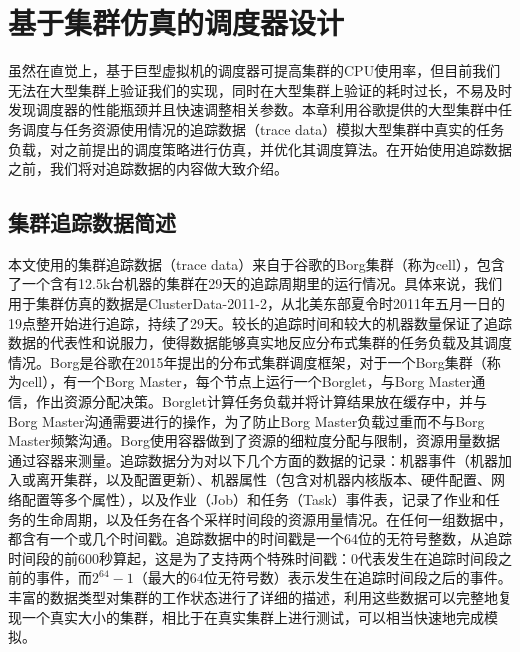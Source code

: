 
\chapter{基于集群仿真的调度器设计}
虽然在直觉上，基于巨型虚拟机的调度器可提高集群的CPU使用率，但目前我们无法在大型集群上验证我们的实现，同时在大型集群上验证的耗时过长，不易及时发现调度器的性能瓶颈并且快速调整相关参数。本章利用谷歌提供的大型集群中任务调度与任务资源使用情况的追踪数据（trace data）模拟大型集群中真实的任务负载，对之前提出的调度策略进行仿真，并优化其调度算法。在开始使用追踪数据之前，我们将对追踪数据的内容做大致介绍。

\section{集群追踪数据简述}
本文使用的集群追踪数据（trace data）来自于谷歌的Borg集群（称为cell），包含了一个含有12.5k台机器的集群在29天的追踪周期里的运行情况。具体来说，我们用于集群仿真的数据是ClusterData-2011-2，从北美东部夏令时2011年五月一日的19点整开始进行追踪，持续了29天。较长的追踪时间和较大的机器数量保证了追踪数据的代表性和说服力，使得数据能够真实地反应分布式集群的任务负载及其调度情况。Borg\cite{borg}是谷歌在2015年提出的分布式集群调度框架，对于一个Borg集群（称为cell），有一个Borg Master，每个节点上运行一个Borglet，与Borg Master通信，作出资源分配决策。Borglet计算任务负载并将计算结果放在缓存中，并与Borg Master沟通需要进行的操作，为了防止Borg Master负载过重而不与Borg Master频繁沟通。Borg使用容器做到了资源的细粒度分配与限制，资源用量数据通过容器来测量。追踪数据分为对以下几个方面的数据的记录：机器事件（机器加入或离开集群，以及配置更新）、机器属性（包含对机器内核版本、硬件配置、网络配置等多个属性），以及作业（Job）和任务（Task）事件表，记录了作业和任务的生命周期，以及任务在各个采样时间段的资源用量情况。在任何一组数据中，都含有一个或几个时间戳。追踪数据中的时间戳是一个64位的无符号整数，从追踪时间段的前600秒算起，这是为了支持两个特殊时间戳：0代表发生在追踪时间段之前的事件，而$2^{64}-1$（最大的64位无符号数）表示发生在追踪时间段之后的事件。丰富的数据类型对集群的工作状态进行了详细的描述，利用这些数据可以完整地复现一个真实大小的集群，相比于在真实集群上进行测试，可以相当快速地完成模拟。

